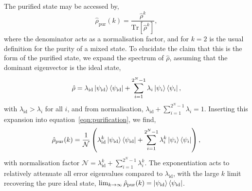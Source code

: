 The purified state may be accessed by,
\begin{equation}
    \label{eqn:purification}
    \hat\rho_\mathrm{pur}(k) = \frac{\hat\rho^k}{\mathrm{Tr}[\hat\rho^k]},
\end{equation}
where the denominator acts as a normalisation factor, and for $k=2$ is the usual definition for the purity of a mixed state. To elucidate the claim that this is the form of the purified state, we expand the spectrum of $\hat\rho$, assuming that the dominant eigenvector is the ideal state, 
\begin{equation}
\hat\rho = \lambda_\mathrm{id} \ket{\psi_\mathrm{id}}\bra{\psi_\mathrm{id}} + \sum_{i=1}^{2^N-1}\lambda_i\ket{\psi_i}\bra{\psi_i},
\end{equation}
with $\lambda_\mathrm{id} > \lambda_i$ for all $i$, and from normalisation, $\lambda_\mathrm{id}+\sum_{i=1}^{2^N-1}\lambda_i = 1$.
Inserting this expansion into equation~\ref{eqn:purification}, we find,
\begin{equation}
    \label{eqn:rho_pur}
    \hat\rho_\mathrm{pur}(k) = \frac{1}{\mathcal{N}}\left( \lambda_\mathrm{id}^k\ket{\psi_\mathrm{id}}\bra{\psi_\mathrm{id}} + \sum_{i=1}^{2^N-1}\lambda_i^k\ket{\psi_i}\bra{\psi_i} \right),
\end{equation}
with normalisation factor $\mathcal{N} = \lambda_\mathrm{id}^k  + \sum_{i=1}^{2^N-1}\lambda_i^k$. The exponentiation acts to relatively attenuate all error eigenvalues compared to $\lambda_\mathrm{id}$, with the large $k$ limit recovering the pure ideal state, $\lim_{k\rightarrow\infty}\hat\rho_\mathrm{pur}(k)=\ket{\psi_\mathrm{id}}\bra{\psi_\mathrm{id}}$.


